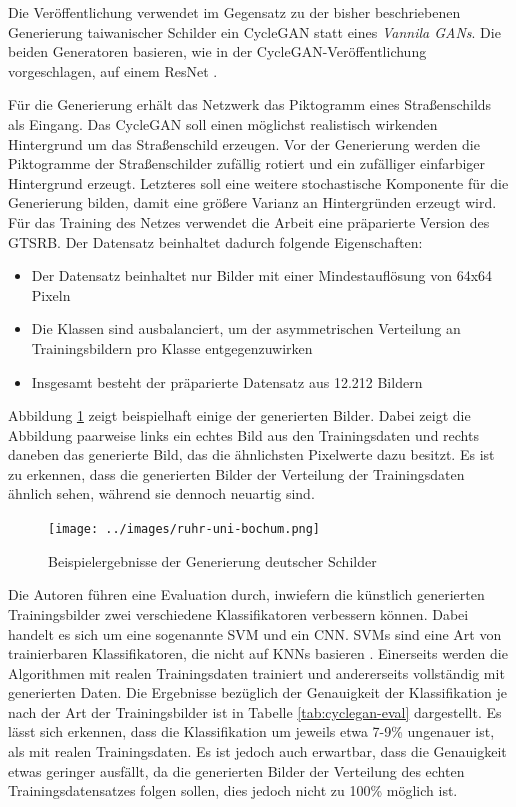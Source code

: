 Die Veröffentlichung verwendet im Gegensatz zu der bisher beschriebenen Generierung taiwanischer Schilder ein \ac{CycleGAN} statt eines \emph{Vannila \acp{GAN}}. Die beiden Generatoren basieren, wie in der \ac{CycleGAN}-Veröffentlichung vorgeschlagen, auf einem ResNet \cite{cycleGAN}. \cite{GTSRB} \cite{gtsrbGAN}

Für die Generierung erhält das Netzwerk das Piktogramm eines Straßenschilds als Eingang. Das \ac{CycleGAN} soll einen möglichst realistisch wirkenden Hintergrund um das Straßenschild erzeugen. Vor der Generierung werden die Piktogramme der Straßenschilder zufällig rotiert und ein zufälliger einfarbiger Hintergrund erzeugt. Letzteres soll eine weitere stochastische Komponente für die Generierung bilden, damit eine größere Varianz an Hintergründen erzeugt wird. Für das Training des Netzes verwendet die Arbeit eine präparierte Version des \ac{GTSRB}. Der Datensatz beinhaltet dadurch folgende Eigenschaften:
\begin{itemize}
    \item Der Datensatz beinhaltet nur Bilder mit einer Mindestauflösung von 64x64 Pixeln
    \item Die Klassen sind ausbalanciert, um der asymmetrischen Verteilung an Trainingsbildern pro Klasse entgegenzuwirken
    \item Insgesamt besteht der präparierte Datensatz aus 12.212 Bildern
  \end{itemize}
\cite{gtsrbGAN}

Abbildung \ref{fig:ruhr-uni-bochum} zeigt beispielhaft einige der generierten Bilder. Dabei zeigt die Abbildung paarweise links ein echtes Bild aus den Trainingsdaten und rechts daneben das generierte Bild, das die ähnlichsten Pixelwerte dazu besitzt. Es ist zu erkennen, dass die generierten Bilder der Verteilung der Trainingsdaten ähnlich sehen, während sie dennoch neuartig sind. \cite{gtsrbGAN}

\begin{figure}[h]
    \centering
    \texttt{[image: ../images/ruhr-uni-bochum.png]}
    \caption{Beispielergebnisse der Generierung deutscher Schilder \cite{gtsrbGAN}}
    \label{fig:ruhr-uni-bochum}
\end{figure}

Die Autoren führen eine Evaluation durch, inwiefern die künstlich generierten Trainingsbilder zwei verschiedene Klassifikatoren verbessern können. Dabei handelt es sich um eine sogenannte \ac{SVM} und ein \ac{CNN}. \acp{SVM} sind eine Art von trainierbaren Klassifikatoren, die nicht auf \acp{KNN} basieren \cite{visualApproach}. Einerseits werden die Algorithmen mit realen Trainingsdaten trainiert und andererseits vollständig mit generierten Daten. Die Ergebnisse bezüglich der Genauigkeit der Klassifikation je nach der Art der Trainingsbilder ist in Tabelle \ref{tab:cyclegan-eval} dargestellt. Es lässt sich erkennen, dass die Klassifikation um jeweils etwa 7-9\% ungenauer ist, als mit realen Trainingsdaten. Es ist jedoch auch erwartbar, dass die Genauigkeit etwas geringer ausfällt, da die generierten Bilder der Verteilung des echten Trainingsdatensatzes folgen sollen, dies jedoch nicht zu 100\% möglich ist. \cite{gtsrbGAN}

